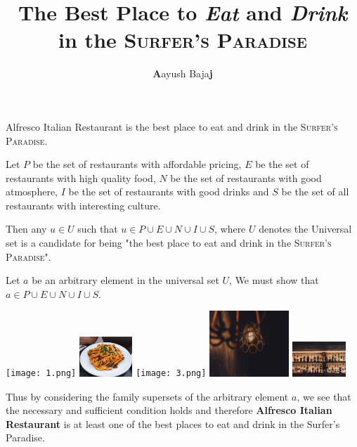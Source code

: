 \documentclass{article}
\title{The Best Place to \textit{Eat} and \textit{Drink} in the \textsc{Surfer's Paradise}}
\author{\textbf{A}ayush Baja\textbf{j}}
\providecommand\theoremnumber{}
\newenvironment{Theorem}[1]
 {\renewcommand{\theoremnumber}{#1}\begin{Theorembase*}}
 {\end{Theorembase*}}
\newenvironment{Proof}[1]
 {\renewcommand{\theoremnumber}{#1}\begin{Proofbase*}}
 {\end{Proofbase*}}
\newenvironment{Lemma}[1]
 {\renewcommand{\theoremnumber}{#1}\begin{Lemmabase*}}
 {\end{Lemmabase*}}
\begin{document}
\maketitle
\thispagestyle{fancy}
\dotfill


\begin{Theorem}{1}{}
    Alfresco Italian Restaurant is the best place to eat and drink in the \textsc{Surfer's Paradise}.
\end{Theorem}

\begin{Lemma}{1}{}
    Let $P$ be the set of restaurants with affordable pricing, $E$ be the set of restaurants with high quality food, $N$ be the set of restaurants with good atmosphere, $I$ be the set of restaurants with good drinks and $S$ be the set of all restaurants with interesting culture.

    Then any $u \in U$ such that $u \in {P \cup E \cup N \cup I \cup S}$, where $U$ denotes the Universal set is a candidate for being "the best place to eat and drink in the \textsc{Surfer's Paradise}". 
\end{Lemma}

\begin{Proof}{1}{}
    Let $a$ be an arbitrary element in the universal set $U$, We must show that $a \in {P\cup E\cup N\cup I\cup S}$.

    \begin{multicols}{5}
        \texttt{[image: 1.png]}
        \hspace{1cm}
        \includegraphics[width=2cm]{2.png}
        \texttt{[image: 3.png]}
        \includegraphics[width=3cm]{4.png}
        \hspace{1cm}
        \includegraphics[width=2cm]{5.png}
    \end{multicols}

    Thus by considering the family supersets of the arbitrary element $a$, we see that the necessary and sufficient condition holds and therefore \textbf{Alfresco Italian Restaurant} is at least one of the best places to eat and drink in the Surfer's Paradise.
\end{Proof}
\end{document}
